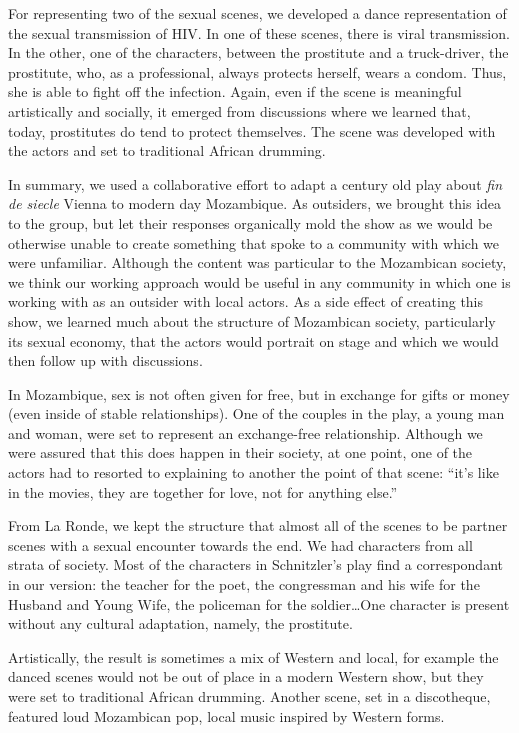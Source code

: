 \documentclass[article,twocolumn]{memoir}
\begin{document}
For representing two of the sexual scenes, we developed a dance representation
of the sexual transmission of HIV. In one of these scenes, there is viral
transmission. In the other, one of the characters, between the prostitute and a
truck-driver, the prostitute, who, as a professional, always protects herself,
wears a condom. Thus, she is able to fight off the infection. Again, even if
the scene is meaningful artistically and socially, it emerged from discussions
where we learned that, today, prostitutes do tend to protect themselves.  The
scene was developed with the actors and set to traditional African drumming.

\bigskip
\bigskip
\bigskip

In summary, we used a collaborative effort to adapt a century old play about
\textit{fin de siecle} Vienna to modern day Mozambique. As outsiders, we
brought this idea to the group, but let their responses organically mold the
show as we would be otherwise unable to create something that spoke to a
community with which we were unfamiliar. Although the content was particular to
the Mozambican society, we think our working approach would be useful in any
community in which one is working with as an outsider with local actors. As a
side effect of creating this show, we learned much about the structure of
Mozambican society, particularly its sexual economy, that the actors would
portrait on stage and which we would then follow up with discussions.

In Mozambique, sex is not often given for free, but in exchange for gifts or
money (even inside of stable relationships). One of the couples in the play, a
young man and woman, were set to represent an exchange-free relationship.
Although we were assured that this does happen in their society, at one point,
one of the actors had to resorted to explaining to another the point of that
scene: ``it's like in the movies, they are together for love, not for anything
else.''

From La Ronde, we kept the structure that almost all of the scenes to be
partner scenes with a sexual encounter towards the end. We had characters from
all strata of society. Most of the characters in Schnitzler's play find a
correspondant in our version: the teacher for the poet, the congressman and his
wife for the Husband and Young Wife, the policeman for the soldier\ldots One
character is present without any cultural adaptation, namely, the prostitute.

Artistically, the result is sometimes a mix of Western and local, for example
the danced scenes would not be out of place in a modern Western show, but they
were set to traditional African drumming. Another scene, set in a discotheque,
featured loud Mozambican pop, local music inspired by Western forms.
\end{document}

